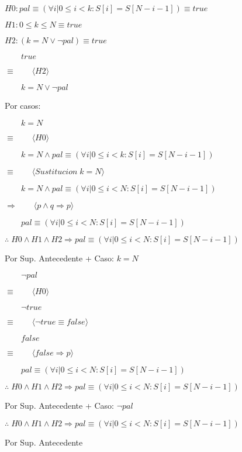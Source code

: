 \documentclass[hidelinks]{article}
\begin{document}
\begin{framed}
    $H0: pal \equiv (\forall i | 0 \leq i < k : S[i]=S[N-i-1]) \equiv true$ \par
    $H1: 0 \leq k \leq N \equiv true$ \par
    $H2: (k=N \lor \neg pal) \equiv true$ \par

    \begin{framed}
        $\qquad true$\par
        $\equiv  \qquad \langle H2 \rangle$\par
        $\qquad k=N \lor \neg pal$

        Por casos:

        \begin{framed}
            $\qquad k=N$ \par
            $\equiv  \qquad \langle H0 \rangle$\par
            $\qquad k=N \land pal \equiv (\forall i | 0 \leq i < k : S[i]=S[N-i-1])$ \par
            $\equiv  \qquad \langle Sustitucion \; k=N \rangle$\par
            $\qquad k=N \land pal \equiv (\forall i | 0 \leq i < N : S[i]=S[N-i-1])$ \par
            $\Rightarrow  \qquad \langle p \land q \Rightarrow p \rangle$\par
            $\qquad pal \equiv (\forall i | 0 \leq i < N : S[i]=S[N-i-1])$ \par
        \end{framed}
        \vspace{-1.7em}
        $ \therefore \; H0 \land H1 \land H2 \Rightarrow pal \equiv (\forall i | 0 \leq i < N : S[i]=S[N-i-1])$\par
        Por Sup. Antecedente + Caso: $k=N$
        \begin{framed}
            $\qquad \neg pal$ \par
            $\equiv  \qquad \langle H0 \rangle$\par
            $\qquad \neg true$ \par
            $\equiv  \qquad \langle \neg true \equiv false \rangle$\par
            $\qquad false $ \par
            $\equiv  \qquad \langle false \Rightarrow p \rangle$\par
            $\qquad pal \equiv (\forall i | 0 \leq i < N : S[i]=S[N-i-1]) $ \par
        \end{framed}
        \vspace{-1.7em}
        $ \therefore \; H0 \land H1 \land H2 \Rightarrow pal \equiv (\forall i | 0 \leq i < N : S[i]=S[N-i-1])$\par
        Por Sup. Antecedente + Caso: $\neg pal$
    \end{framed}
    \vspace{-1.7em}
    $ \therefore \; H0 \land H1 \land H2 \Rightarrow pal \equiv (\forall i | 0 \leq i < N : S[i]=S[N-i-1])$\par
    Por Sup. Antecedente
\end{framed}
\end{document}
